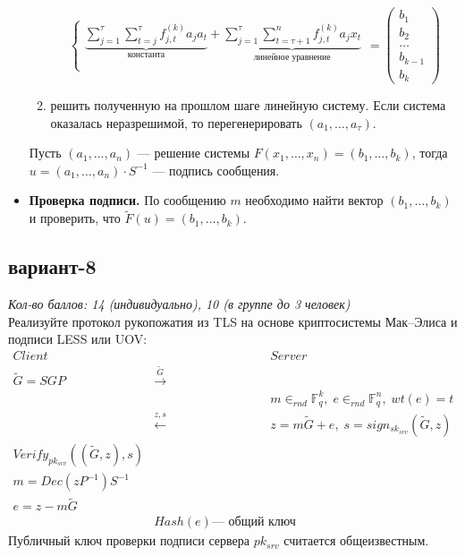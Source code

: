 \documentclass[12pt,letterpaper]{article}
\newcommand{\FF}{\mathds{F}}
\begin{document}
\begin{itemize}
\begin{enumerate}
\[\begin{cases}
        \underbrace{\sum_{j = 1}^\tau \sum_{t = j}^\tau f^{(k)}_{j,t} a_j a_t }_{\text{константа}}  + \underbrace{\sum_{j = 1}^\tau \sum_{t = \tau+1}^n f^{(k)}_{j,t} a_j x_t}_{\text{линейное уравнение}} \\
      \end{cases} =
      \begin{pmatrix}
        b_1 \\ b_2 \\ \dots \\ b_{k-1} \\ b_{k}
      \end{pmatrix}
    \]
    \item решить полученную на прошлом шаге линейную систему. Если система оказалась неразрешимой, то перегенерировать $(a_1, \dots, a_{\tau})$.
  \end{enumerate}
  Пусть $(a_1, \dots, a_n)$ --- решение системы $F(x_1, \dots, x_n) = (b_1, \dots, b_k)$, тогда $u = (a_1, \dots, a_n) \cdot S^{-1}$ --- подпись сообщения.
  \item \textbf{Проверка подписи.} По сообщению $m$ необходимо найти вектор $(b_1, \dots, b_k)$ и проверить, что
  $\tilde{F}(u) = (b_1, \dots, b_k)$.
\end{itemize}



\subsection*{вариант-8}
\textit{Кол-во баллов: 14 (индивидуально), 10 (в группе до 3 человек)}\\
Реализуйте протокол рукопожатия из TLS на основе криптосистемы Мак--Элиса и подписи LESS или UOV: 
\[
\begin{array}{ccc}
  Client & & Server \\
  \tilde{G} = S G P & \xrightarrow{\tilde{G}} & \\
  &  & m \in_{rnd} \FF_q^k, \; e \in_{rnd} \FF_q^n, \; wt(e) = t \\
  & \xleftarrow{z, s} & z = m \tilde{G} + e, \; s = sign_{sk_{srv}}(\tilde{G}, z) \\
  Verify_{pk_{srv}}\left( (\tilde{G}, z), s \right) & & \\
  m = Dec(z P^{-1}) S^{-1} & & \\
  e = z - m\tilde{G} & & \\

  & Hash(e)  \text{--- общий ключ} &
\end{array}
\]
Публичный ключ проверки подписи сервера $pk_{srv}$ считается общеизвестным.
\end{document}
